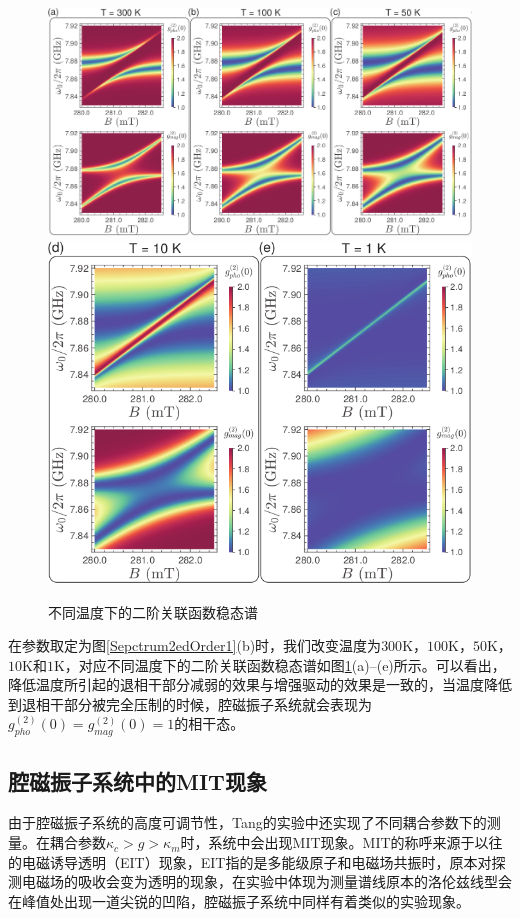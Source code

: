 \begin{figure}[htbp]
	\centering
	\includegraphics[width=3\basefigurewidth,clip]{./figure/4_4_1}
	\includegraphics[width=2\basefigurewidth,clip]{./figure/4_4_2}
	\caption{不同温度下的二阶关联函数稳态谱} 
	\label{Sepctrum2edOrder2}
\end{figure}
在参数取定为图\ref{Sepctrum2edOrder1}(b)时，我们改变温度为$300$K，$100$K，$50$K，$10$K和$1$K，对应不同温度下的二阶关联函数稳态谱如图\ref{Sepctrum2edOrder2}(a)--(e)所示。可以看出，降低温度所引起的退相干部分减弱的效果与增强驱动的效果是一致的，当温度降低到退相干部分被完全压制的时候，腔磁振子系统就会表现为$g_{pho}^{(2)}(0)=g_{mag}^{(2)}(0)=1$的相干态。

\subsection{腔磁振子系统中的MIT现象}
由于腔磁振子系统的高度可调节性，Tang的实验中还实现了不同耦合参数下的测量。在耦合参数$\kappa_c>g>\kappa_m$时，系统中会出现MIT现象。MIT的称呼来源于以往的电磁诱导透明（EIT）现象，EIT指的是多能级原子和电磁场共振时，原本对探测电磁场的吸收会变为透明的现象，在实验中体现为测量谱线原本的洛伦兹线型会在峰值处出现一道尖锐的凹陷，腔磁振子系统中同样有着类似的实验现象。

